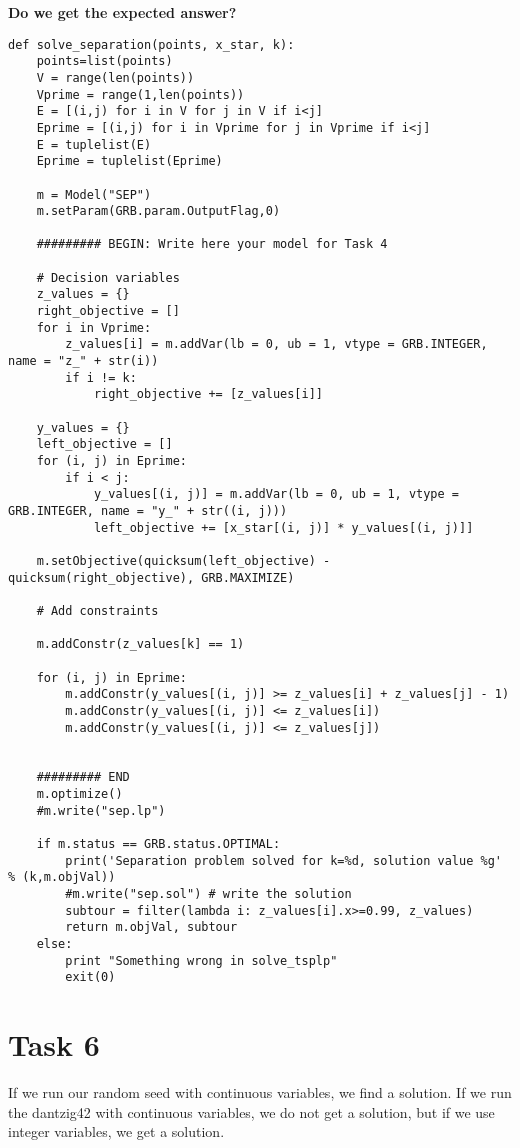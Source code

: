 \documentclass[a4paper,10pt]{article}
\begin{document}
\textbf{Do we get the expected answer?}

\begin{lstlisting}
def solve_separation(points, x_star, k):
    points=list(points)
    V = range(len(points))
    Vprime = range(1,len(points))
    E = [(i,j) for i in V for j in V if i<j]
    Eprime = [(i,j) for i in Vprime for j in Vprime if i<j]
    E = tuplelist(E)
    Eprime = tuplelist(Eprime)

    m = Model("SEP")
    m.setParam(GRB.param.OutputFlag,0)
    
    ######### BEGIN: Write here your model for Task 4

    # Decision variables
    z_values = {}
    right_objective = []
    for i in Vprime:
        z_values[i] = m.addVar(lb = 0, ub = 1, vtype = GRB.INTEGER, name = "z_" + str(i))
        if i != k:
            right_objective += [z_values[i]]
    
    y_values = {}
    left_objective = []
    for (i, j) in Eprime:
        if i < j:
            y_values[(i, j)] = m.addVar(lb = 0, ub = 1, vtype = GRB.INTEGER, name = "y_" + str((i, j)))
            left_objective += [x_star[(i, j)] * y_values[(i, j)]]
    
    m.setObjective(quicksum(left_objective) - quicksum(right_objective), GRB.MAXIMIZE)
    
    # Add constraints
    
    m.addConstr(z_values[k] == 1)
    
    for (i, j) in Eprime:
        m.addConstr(y_values[(i, j)] >= z_values[i] + z_values[j] - 1)
        m.addConstr(y_values[(i, j)] <= z_values[i])
        m.addConstr(y_values[(i, j)] <= z_values[j])
            
    
    ######### END
    m.optimize()
    #m.write("sep.lp")
    
    if m.status == GRB.status.OPTIMAL:
        print('Separation problem solved for k=%d, solution value %g' % (k,m.objVal))
        #m.write("sep.sol") # write the solution    
        subtour = filter(lambda i: z_values[i].x>=0.99, z_values)
        return m.objVal, subtour
    else:
        print "Something wrong in solve_tsplp"
        exit(0)
\end{lstlisting}


\newpage
\section*{Task 6}


If we run our random seed with continuous variables, we find a solution. If we run the dantzig42 with continuous variables, we do not get a solution, but if we use integer variables, we get a solution. 
\end{document}
